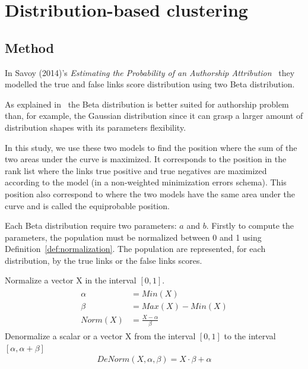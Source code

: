 \section{Distribution-based clustering\label{sec:distribution_based_clustering}}

\subsection{Method}

In Savoy (2014)'s \textit{Estimating the Probability of an Authorship Attribution}~\cite{savoy_probability} they modelled the true and false links score distribution using two Beta distribution.

As explained in~\cite{savoy_probability} the Beta distribution is better suited for authorship problem than, for example, the Gaussian distribution since it can grasp a larger amount of distribution shapes with its parameters flexibility.

In this study, we use these two models to find the position where the sum of the two areas under the curve is maximized.
It corresponds to the position in the rank list where the links true positive and true negatives are maximized according to the model (in a non-weighted minimization errors schema).
This position also correspond to where the two models have the same area under the curve and is called the equiprobable position.

Each Beta distribution require two parameters: $a$ and $b$.
Firstly to compute the parameters, the population must be normalized between 0 and 1 using Definition~\ref{def:normalization}.
The population are represented, for each distribution, by the true links or the false links scores.

\begin{definition}
  Normalize a vector X in the interval $[0, 1]$.
  \begin{gather*}
    \begin{aligned}
      \alpha &= Min(X) \\
      \beta &= Max(X) - Min(X) \\
      Norm(X) &= \frac{X - \alpha}{\beta}
    \end{aligned}
  \end{gather*}
  Denormalize a scalar or a vector X from the interval $[0, 1]$ to the interval $[\alpha, \alpha + \beta]$
  \begin{gather*}
    DeNorm(X, \alpha, \beta) = X \cdot \beta + \alpha
  \end{gather*}
\end{definition}

